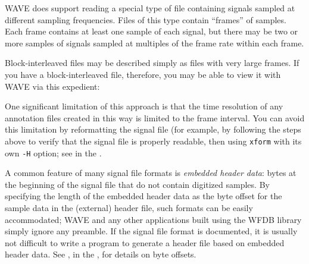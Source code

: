 \documentclass[twoside]{book}
\newcommand{\WAVE}{{\sf WAVE}\xspace}
\begin{document}
\WAVE{} does support reading a special type of file containing signals
sampled at different sampling frequencies.  Files of this type contain
``frames'' of samples.  Each frame contains at least one sample of
each signal, but there may be two or more samples of signals sampled
at multiples of the frame rate within each frame.

Block-interleaved files may be described simply as files with very
large frames.  If you have a block-interleaved file, therefore, you
may be able to view it with \WAVE{} via this expedient:


One significant limitation of this approach is that the time
resolution of any annotation files created in this way is limited to
the frame interval.  You can avoid this limitation by reformatting the
signal file (for example, by following the steps above to verify that
the signal file is properly readable, then using {\tt xform} with its
own {\tt -H} option; see
in the
.

A common feature of many signal file formats is \emph{embedded header
data}:  bytes at the beginning of the signal file that do not contain
digitized samples.  By specifying the length of the embedded header
data as the byte offset for the sample data in the (external) header
file, such formats can be easily accommodated;  \WAVE{} and any other
applications built using the WFDB library simply ignore any preamble.
If the signal file format is documented, it is usually not difficult to
write a program to generate a header file based on embedded header
data.  See
, in the 
,
for details on byte offsets.
\end{document}
